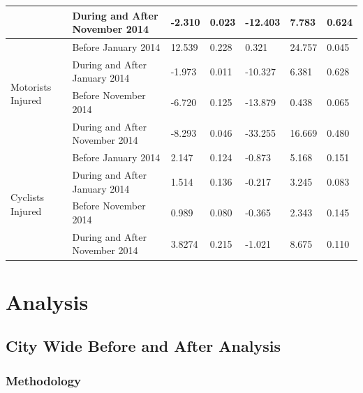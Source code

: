 \documentclass[10pt,journal,compsoc]{IEEEtran}
\begin{document}
\begin{table}[]
\begin{tabular}{|l|l|l|l|l|l|l|}
                                     & During and After November 2014  & -2.310      & 0.023 & -12.403                & 7.783                & 0.624   \\ \hline
\multirow{4}{*}{Motorists Injured}   & Before January 2014 & 12.539      & 0.228 & 0.321                  & 24.757               & 0.045   \\ \cline{2-7} 
                                     & During and After January 2014  & -1.973      & 0.011 & -10.327                & 6.381                & 0.628   \\ \cline{2-7} 
                                     & Before November 2014 & -6.720      & 0.125 & -13.879                & 0.438                & 0.065   \\ \cline{2-7} 
                                     & During and After November 2014  & -8.293      & 0.046 & -33.255                & 16.669               & 0.480   \\ \hline
\multirow{4}{*}{Cyclists Injured}    & Before January 2014 & 2.147       & 0.124 & -0.873                 & 5.168                & 0.151   \\ \cline{2-7} 
                                     & During and After January 2014  & 1.514       & 0.136 & -0.217                 & 3.245                & 0.083   \\ \cline{2-7} 
                                     & Before November 2014 & 0.989       & 0.080 & -0.365                 & 2.343                & 0.145   \\ \cline{2-7} 
                                     & During and After November 2014  & 3.8274      & 0.215 & -1.021                 & 8.675                & 0.110   \\ \hline
\end{tabular}
\end{table}

\section{Analysis}
\subsection{City Wide Before and After Analysis}

\subsubsection{Methodology}
\end{document}
